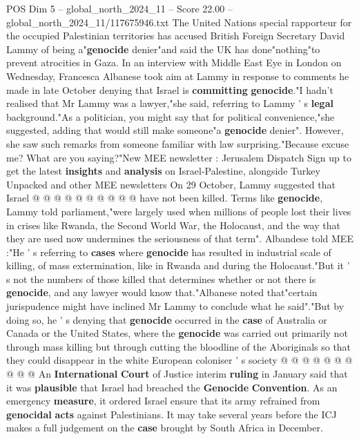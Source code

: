 \begin{textsample}{POS Dim 5 – global\_north\_2024\_11 – Score 22.00 – global\_north\_2024\_11/117675946.txt}  \label{ex:f5_pos_033}
The United Nations special rapporteur for the occupied Palestinian territories has accused British Foreign Secretary David Lammy of being a"\textbf{genocide} denier"and said the UK has done"nothing"to prevent atrocities in Gaza.
In an interview with Middle East Eye in London on Wednesday, Francesca Albanese took aim at Lammy in response to comments he made in late October denying that Israel is \textbf{committing} \textbf{genocide}."I hadn't realised that Mr Lammy was a lawyer,"she said, referring to Lammy ' s \textbf{legal} background."As a politician, you might say that for political convenience,"she suggested, adding that would still make someone"a \textbf{genocide} denier".
However, she saw such remarks from someone familiar with law surprising."Because excuse me?
What are you saying?"New MEE newsletter : Jerusalem Dispatch Sign up to get the latest \textbf{insights} and \textbf{analysis} on Israel-Palestine, alongside Turkey Unpacked and other MEE newsletters On 29 October, Lammy suggested that Israel @ @ @ @ @ @ @ @ @ @ have not been killed.
Terms like \textbf{genocide}, Lammy told parliament,"were largely used when millions of people lost their lives in crises like Rwanda, the Second World War, the Holocaust, and the way that they are used now undermines the seriousness of that term".
Albandese told MEE :"He ' s referring to \textbf{cases} where \textbf{genocide} has resulted in industrial scale of killing, of mass extermination, like in Rwanda and during the Holocaust."But it ' s not the numbers of those killed that determines whether or not there is \textbf{genocide}, and any lawyer would know that."Albanese noted that"certain jurispudence might have inclined Mr Lammy to conclude what he said"."But by doing so, he ' s denying that \textbf{genocide} occurred in the \textbf{case} of Australia or Canada or the United States, where the \textbf{genocide} was carried out primarily not through mass killing but through cutting the bloodline of the Aboriginals so that they could disappear in the white European coloniser ' s society @ @ @ @ @ @ @ @ @ @ An \textbf{International} \textbf{Court} of Justice interim \textbf{ruling} in January said that it was \textbf{plausible} that Israel had breached the \textbf{Genocide} \textbf{Convention}.
As an emergency \textbf{measure}, it ordered Israel ensure that its army refrained from \textbf{genocidal} \textbf{acts} against Palestinians.
It may take several years before the ICJ makes a full judgement on the \textbf{case} brought by South Africa in December.

\end{textsample}
